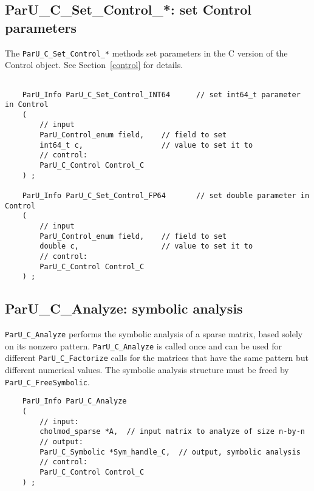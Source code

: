 \documentclass[12pt]{article}
\begin{document}
\subsection{{\sf ParU\_C\_Set\_Control\_*}: set Control parameters}

The \verb'ParU_C_Set_Control_*' methods set parameters in the C version of the
Control object.  See Section~\ref{control} for details.

    {\footnotesize
    \begin{verbatim}

    ParU_Info ParU_C_Set_Control_INT64      // set int64_t parameter in Control
    (
        // input
        ParU_Control_enum field,    // field to set
        int64_t c,                  // value to set it to
        // control:
        ParU_C_Control Control_C
    ) ;

    ParU_Info ParU_C_Set_Control_FP64       // set double parameter in Control
    (
        // input
        ParU_Control_enum field,    // field to set
        double c,                   // value to set it to
        // control:
        ParU_C_Control Control_C
    ) ; \end{verbatim} }

\subsection{{\sf ParU\_C\_Analyze}: symbolic analysis}

    \verb'ParU_C_Analyze' performs the symbolic analysis of a sparse
        matrix, based solely on its nonzero pattern.  \verb'ParU_C_Analyze' is
        called once and can be used for different \verb'ParU_C_Factorize' calls
        for the matrices that have the same pattern but different numerical
        values.  The symbolic analysis structure must be freed by
        \verb'ParU_C_FreeSymbolic'.

    {\footnotesize
    \begin{verbatim}
    ParU_Info ParU_C_Analyze
    (
        // input:
        cholmod_sparse *A,  // input matrix to analyze of size n-by-n
        // output:
        ParU_C_Symbolic *Sym_handle_C,  // output, symbolic analysis
        // control:
        ParU_C_Control Control_C
    ) ; \end{verbatim} }
\end{document}
